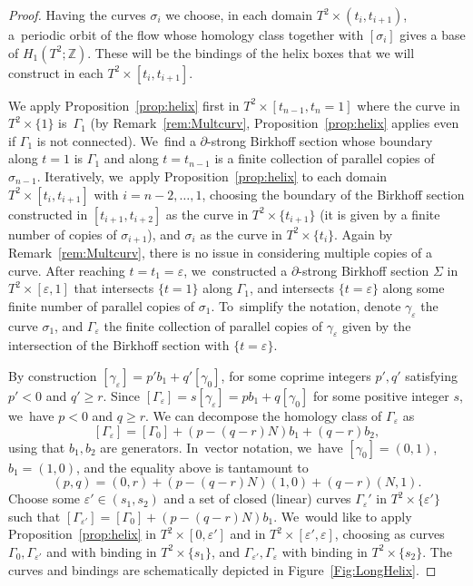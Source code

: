 \begin{proof}
Having the curves $\sigma_i$ we choose, in each domain $T^2\times (t_i, t_{i+1})$, a~periodic orbit of the flow whose homology class together with $[\sigma_i]$ gives a base of $H_1(T^2;\mathbb{Z})$. These will be the bindings of the helix boxes that we will construct in each $T^2\times [t_i, t_{i+1}]$.

We apply Proposition~\ref{prop:helix} first in $T^2\times [t_{n-1},t_n=1]$ where the curve in $T^2\times \{1\}$ is~$\Gamma_1$ (by Remark~\ref{rem:Multcurv}, Proposition~\ref{prop:helix} applies even if $\Gamma_1$ is not connected). We~find a $\partial$-strong Birkhoff section whose boundary along $t=1$ is $\Gamma_1$ and along $t=t_{n-1}$ is a finite collection of parallel copies of $\sigma_{n-1}$. Iteratively, we~apply Proposition~\ref{prop:helix} to each domain $T^2\times [t_i,t_{i+1}]$ with $i=n-2,\dots,1$, choosing the boundary of the Birkhoff section constructed in $[t_{i+1},t_{i+2}]$ as the curve in $T^2\times \{t_{i+1}\}$ (it is given by a finite number of copies of $\sigma_{i+1}$), and $\sigma_i$ as the curve in $T^2\times \{t_i\}$. Again by Remark~\ref{rem:Multcurv}, there is no issue in considering multiple copies of a curve. After reaching $t=t_1=\varepsilon$, we~constructed a $\partial$-strong Birkhoff section $\Sigma$ in $T^2\times [\varepsilon,1]$ that intersects $\{t=1\}$ along $\Gamma_1$, and intersects $\{t=\varepsilon\}$ along some finite number of parallel copies of $\sigma_1$. To~simplify the notation, denote $\gamma_\varepsilon$ the curve $\sigma_1$, and $\Gamma_\varepsilon$ the finite collection of parallel copies of $\gamma_\varepsilon$ given by the intersection of the Birkhoff section with $\{t=\varepsilon\}$.

By construction $[\gamma_\varepsilon]= p' b_1 + q' [\gamma_0]$,
for some coprime integers $p',q'$ satisfying $p'<0$ and $q'\geq r$. Since
$[\Gamma_\varepsilon]= s[\gamma_\varepsilon]=pb_1+q[\gamma_0]$
for some positive integer $s$, we~have $p<0$ and $q\geq r$.
We can decompose the homology class of $\Gamma_\varepsilon$ as
\[
[\Gamma_\varepsilon]= [\Gamma_0] + (p-(q-r)N)b_1 + (q-r)b_2,
\]
using that $b_1,b_2$ are generators. In~vector notation, we~have $[\gamma_0]=(0,1)$, $b_1=(1,0)$, and the equality above is tantamount to
\[
(p,q)= (0,r) + (p-(q-r)N)(1,0) + (q-r) (N,1).
\]
Choose some $\varepsilon'\in (s_1,s_2)$ and a set of closed (linear) curves $\Gamma_\varepsilon'$ in $T^2\times \{\varepsilon'\}$ such that $[\Gamma_{\varepsilon'}]=[\Gamma_0]+(p-(q-r)N)b_1$. We~would like to apply Proposition~\ref{prop:helix} in $T^2\times [0,\varepsilon']$ and in $T^2\times [\varepsilon',\varepsilon]$, choosing as curves $\Gamma_0, \Gamma_{\varepsilon'}$ and with binding in $T^2\times \{s_1\}$, and $\Gamma_{\varepsilon'}, \Gamma_{\varepsilon}$ with binding in $T^2\times \{s_2\}$. The curves and bindings are schematically depicted in Figure~\ref{Fig:LongHelix}.


\end{proof}
